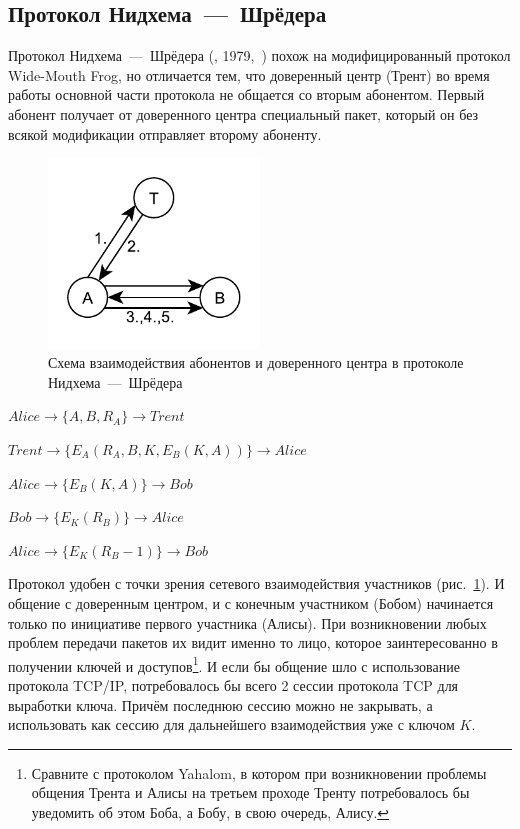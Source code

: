 \subsection{Протокол Нидхема~---~Шрёдера}\label{section-protocols-needham-schroeder}

Протокол Нидхема~---~Шрёдера (, 1979,~\cite{Needham:Schroeder:1978}) похож на модифицированный протокол Wide-Mouth Frog, но отличается тем, что доверенный центр (Трент) во время работы основной части протокола не общается со вторым абонентом. Первый абонент получает от доверенного центра специальный пакет, который он без всякой модификации отправляет второму абоненту.

\begin{figure}
    \centering
    \includegraphics[width=0.5\textwidth]{pic/key_distribution-needham-schroeder}
    \caption{Схема взаимодействия абонентов и доверенного центра в протоколе Нидхема~---~Шрёдера\label{fig:key_distribution-needham-schroeder}}
\end{figure}

\begin{protocol}
	\item[(1)] $ Alice	\to \{ A, B, R_A \}						\to Trent $
	\item[(2)] $ Trent	\to \{ E_A \left( R_A, B, K, E_B \left( K, A \right) \right) \}	\to Alice $
	\item[(3)] $ Alice	\to \{ E_B \left( K, A \right) \}				\to Bob $
	\item[(4)] $ Bob	\to \{ E_K \left( R_B \right) \}				\to Alice $
	\item[(5)] $ Alice	\to \{ E_K \left( R_B - 1 \right) \}				\to Bob $
\end{protocol}

Протокол удобен с точки зрения сетевого взаимодействия участников (рис.~\ref{fig:key_distribution-needham-schroeder}). И общение с доверенным центром, и с конечным участником (Бобом) начинается только по инициативе первого участника (Алисы). При возникновении любых проблем передачи пакетов их видит именно то лицо, которое заинтересованно в получении ключей и доступов\footnote{Сравните с протоколом Yahalom, в котором при возникновении проблемы общения Трента и Алисы на третьем проходе Тренту потребовалось бы уведомить об этом Боба, а Бобу, в свою очередь, Алису.}. И если бы общение шло с использование протокола TCP/IP, потребовалось бы всего 2 сессии протокола TCP для выработки ключа. Причём последнюю сессию можно не закрывать, а использовать как сессию для дальнейшего взаимодействия уже с ключом $K$.

